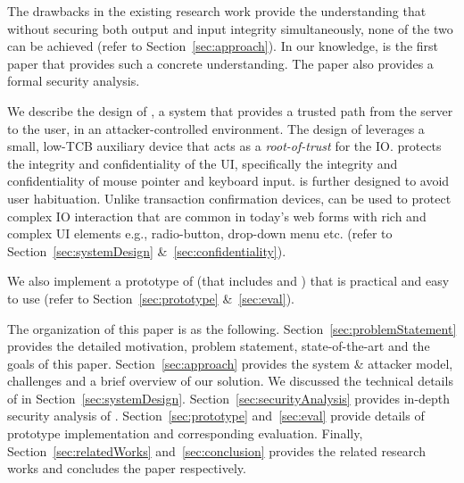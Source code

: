 

\begin{mybullet}
  \item The drawbacks in the existing research work provide the understanding that without securing both output and input integrity simultaneously, none of the two can be achieved  (refer to Section~\ref{sec:approach}). In our knowledge, \name is the first paper that provides such a concrete understanding. The paper also provides a formal security analysis. 
  \item We describe the design of \name, a system that provides a  trusted path from the server to the user, in an attacker-controlled environment. The design of \name leverages a small, low-TCB auxiliary device that acts as a \emph{root-of-trust} for the IO. \name protects the integrity and confidentiality of the UI, specifically the integrity and confidentiality of mouse pointer and keyboard input. \name is further designed to avoid user habituation. Unlike transaction confirmation devices, \name can be used to protect complex IO interaction that are common in today's web forms with rich and complex UI elements e.g., radio-button, drop-down menu etc. (refer to Section~\ref{sec:systemDesign} \&~\ref{sec:confidentiality}).
  \item We also implement a prototype of \name (that includes \device and \name \js) that is practical and easy to use (refer to Section~\ref{sec:prototype} \&~\ref{sec:eval}).
\end{mybullet}


 The organization of this paper is as the following. Section~\ref{sec:problemStatement} provides the detailed motivation, problem statement, state-of-the-art and the goals of this paper. Section~\ref{sec:approach} provides the system \& attacker model, challenges and a brief overview of our solution. We discussed the technical details of \name in Section~\ref{sec:systemDesign}. Section~\ref{sec:securityAnalysis} provides in-depth security analysis of \name. Section~\ref{sec:prototype} and~\ref{sec:eval} provide details of \name prototype implementation and corresponding evaluation. Finally, Section~\ref{sec:relatedWorks} and~\ref{sec:conclusion} provides the related research works and concludes the paper respectively.


